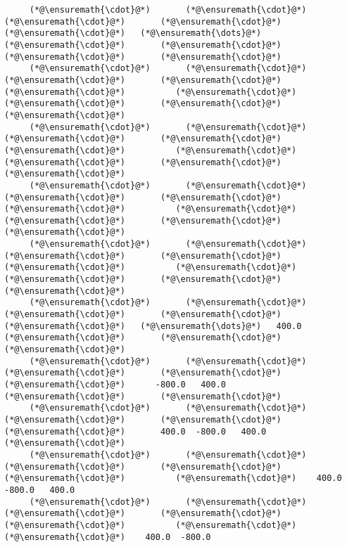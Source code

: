 \documentclass[12pt,a4paper]{article}
\begin{document}
\begin{lstlisting}
     (*@\ensuremath{\cdot}@*)       (*@\ensuremath{\cdot}@*)       (*@\ensuremath{\cdot}@*)       (*@\ensuremath{\cdot}@*)       (*@\ensuremath{\cdot}@*)   (*@\ensuremath{\dots}@*)      (*@\ensuremath{\cdot}@*)       (*@\ensuremath{\cdot}@*)       (*@\ensuremath{\cdot}@*)       (*@\ensuremath{\cdot}@*) 
     (*@\ensuremath{\cdot}@*)       (*@\ensuremath{\cdot}@*)       (*@\ensuremath{\cdot}@*)       (*@\ensuremath{\cdot}@*)       (*@\ensuremath{\cdot}@*)          (*@\ensuremath{\cdot}@*)       (*@\ensuremath{\cdot}@*)       (*@\ensuremath{\cdot}@*)       (*@\ensuremath{\cdot}@*) 
     (*@\ensuremath{\cdot}@*)       (*@\ensuremath{\cdot}@*)       (*@\ensuremath{\cdot}@*)       (*@\ensuremath{\cdot}@*)       (*@\ensuremath{\cdot}@*)          (*@\ensuremath{\cdot}@*)       (*@\ensuremath{\cdot}@*)       (*@\ensuremath{\cdot}@*)       (*@\ensuremath{\cdot}@*) 
     (*@\ensuremath{\cdot}@*)       (*@\ensuremath{\cdot}@*)       (*@\ensuremath{\cdot}@*)       (*@\ensuremath{\cdot}@*)       (*@\ensuremath{\cdot}@*)          (*@\ensuremath{\cdot}@*)       (*@\ensuremath{\cdot}@*)       (*@\ensuremath{\cdot}@*)       (*@\ensuremath{\cdot}@*) 
     (*@\ensuremath{\cdot}@*)       (*@\ensuremath{\cdot}@*)       (*@\ensuremath{\cdot}@*)       (*@\ensuremath{\cdot}@*)       (*@\ensuremath{\cdot}@*)          (*@\ensuremath{\cdot}@*)       (*@\ensuremath{\cdot}@*)       (*@\ensuremath{\cdot}@*)       (*@\ensuremath{\cdot}@*) 
     (*@\ensuremath{\cdot}@*)       (*@\ensuremath{\cdot}@*)       (*@\ensuremath{\cdot}@*)       (*@\ensuremath{\cdot}@*)       (*@\ensuremath{\cdot}@*)   (*@\ensuremath{\dots}@*)   400.0      (*@\ensuremath{\cdot}@*)       (*@\ensuremath{\cdot}@*)       (*@\ensuremath{\cdot}@*) 
     (*@\ensuremath{\cdot}@*)       (*@\ensuremath{\cdot}@*)       (*@\ensuremath{\cdot}@*)       (*@\ensuremath{\cdot}@*)       (*@\ensuremath{\cdot}@*)      -800.0   400.0      (*@\ensuremath{\cdot}@*)       (*@\ensuremath{\cdot}@*) 
     (*@\ensuremath{\cdot}@*)       (*@\ensuremath{\cdot}@*)       (*@\ensuremath{\cdot}@*)       (*@\ensuremath{\cdot}@*)       (*@\ensuremath{\cdot}@*)       400.0  -800.0   400.0      (*@\ensuremath{\cdot}@*) 
     (*@\ensuremath{\cdot}@*)       (*@\ensuremath{\cdot}@*)       (*@\ensuremath{\cdot}@*)       (*@\ensuremath{\cdot}@*)       (*@\ensuremath{\cdot}@*)          (*@\ensuremath{\cdot}@*)    400.0  -800.0   400.0
     (*@\ensuremath{\cdot}@*)       (*@\ensuremath{\cdot}@*)       (*@\ensuremath{\cdot}@*)       (*@\ensuremath{\cdot}@*)       (*@\ensuremath{\cdot}@*)          (*@\ensuremath{\cdot}@*)       (*@\ensuremath{\cdot}@*)    400.0  -800.0
\end{lstlisting}
\end{document}
